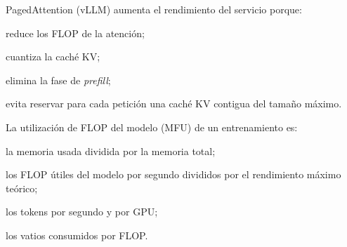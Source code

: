 \begin{cuestiones}
\item {} PagedAttention (vLLM) aumenta el rendimiento del servicio porque:
\begin{opciones}
  \item reduce los FLOP de la atención;
  \item cuantiza la caché KV;
  \item elimina la fase de \emph{prefill};
  \item evita reservar para cada petición una caché KV contigua del tamaño máximo.
\end{opciones}

\item {} La utilización de FLOP del modelo (MFU) de un entrenamiento es:
\begin{opciones}
  \item la memoria usada dividida por la memoria total;
  \item los FLOP útiles del modelo por segundo divididos por el rendimiento máximo teórico;
  \item los tokens por segundo y por GPU;
  \item los vatios consumidos por FLOP.
\end{opciones}
\end{cuestiones}
